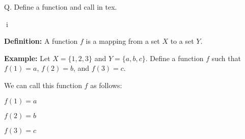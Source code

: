\iffalse

Q. Define a function and call in tex.

i

\textbf{Definition:}
A function $f$ is a mapping from a set $X$ to a set $Y$.

\textbf{Example:}
Let $X = \{1, 2, 3\}$ and $Y = \{a, b, c\}$. Define a function $f$ such that $f(1) = a$, $f(2) = b$, and $f(3) = c$.

We can call this function $f$ as follows:

$f(1) = a$

$f(2) = b$

$f(3) = c$